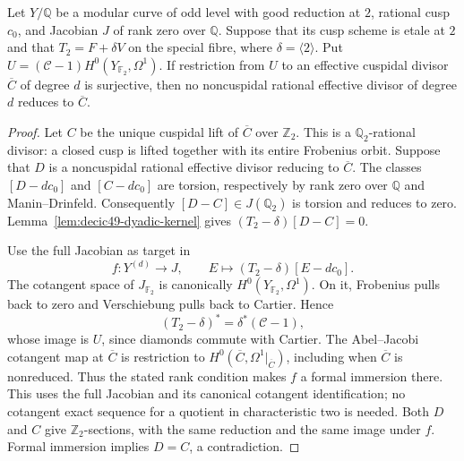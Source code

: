 \begin{lemma}\label{lem:decic49-Cartier}
Let $Y/\mathbb Q$ be a modular curve of odd level with good
reduction at $2$, rational cusp $c_0$, and Jacobian $J$ of rank zero
over $\mathbb Q$. Suppose that its cusp scheme is etale at $2$
and that $T_2=F+\delta V$ on the special fibre, where
$\delta=\langle2\rangle$. Put
$U=(\mathcal C-1)H^0(Y_{\mathbb F_2},\Omega^1)$.
If restriction from $U$ to an effective cuspidal divisor
$\overline C$ of degree $d$ is surjective, then no noncuspidal
rational effective divisor of degree $d$ reduces to $\overline C$.
\end{lemma}
\begin{proof}
Let $C$ be the unique cuspidal lift of $\overline C$ over
$\mathbb Z_2$. This is a $\mathbb Q_2$-rational divisor: a closed
cusp is lifted together with its entire Frobenius orbit.
Suppose that $D$ is a noncuspidal rational effective divisor
reducing to $\overline C$. The classes $[D-dc_0]$ and $[C-dc_0]$
are torsion, respectively by rank zero over $\mathbb Q$ and
Manin--Drinfeld. Consequently $[D-C]\in J(\mathbb Q_2)$ is
torsion and reduces to zero. Lemma~\ref{lem:decic49-dyadic-kernel}
gives $(T_2-\delta)[D-C]=0$.

Use the full Jacobian as target in
\[
 f:Y^{(d)}\longrightarrow J,\qquad
 E\longmapsto(T_2-\delta)[E-dc_0].
\]
The cotangent space of $J_{\mathbb F_2}$ is canonically
$H^0(Y_{\mathbb F_2},\Omega^1)$. On it, Frobenius pulls back to
zero and Verschiebung pulls back to Cartier. Hence
\[
 (T_2-\delta)^*=\delta^*(\mathcal C-1),
\]
whose image is $U$, since diamonds commute with Cartier.
The Abel--Jacobi cotangent map at $\overline C$ is restriction to
$H^0(\overline C,\Omega^1|_{\overline C})$, including when
$\overline C$ is nonreduced. Thus the stated rank condition makes
$f$ a formal immersion there. This uses the full Jacobian and its
canonical cotangent identification; no cotangent exact sequence
for a quotient in characteristic two is needed.
Both $D$ and $C$ give $\mathbb Z_2$-sections, with the same
reduction and the same image under $f$. Formal immersion implies
$D=C$, a contradiction.
\end{proof}
